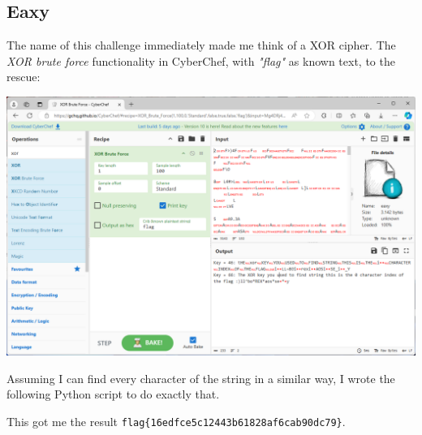 \documentclass{article}
\begin{document}
\subsection{Eaxy}

The name of this challenge immediately made me think of a XOR cipher. The \textit{XOR brute force} functionality in CyberChef, with \textit{"flag"} as known text, to the rescue:

\begin{center}
   \includegraphics[width=\linewidth]{eaxy/screenshot.png}
\end{center}

\noindent
Assuming I can find every character of the string in a similar way, I wrote the following Python script to do exactly that.



\noindent
This got me the result \texttt{flag\{16edfce5c12443b61828af6cab90dc79\}}.
\end{document}
